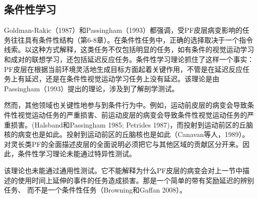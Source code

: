 \subsection{条件性学习}
Goldman-Rakic（1987）和Passingham（1993）都强调，受PF皮层病变影响的任务往往具有条件性结构（第6-8章）。在条件性任务中，正确的选择取决于一个指令线索。以这种方式解释，这类任务不仅包括明显的任务，如有条件的视觉运动学习和成对的联想学习，还包括延迟反应任务。条件性学习理论抓住了这样一个事实：PF皮层在根据当前环境灵活地生成目标方面起着关键作用，不管是在延迟反应任务上有延迟，还是在条件性视觉运动学习任务上没有延迟。该理论是由 Passingham（1993）提出的理论，涉及到了解剖学测试。
\par 
然而，其他领域也关键性地参与到条件行为中。例如，运动前皮层的病变会导致条件性视觉运动任务的严重损害、前运动皮层的病变会导致条件性视觉运动任务的严重损害。(Halsband和Passingham 1985; Petrides 1987)，而投射到运动前区的丘脑核的病变也是如此。投射到运动前区的丘脑核也是如此（Canavan等人，1989）。对灵长类PF的全面描述皮层的全面说明必须把它与其他区域的贡献区分开来。因此，条件性学习理论未能通过特异性测试。
\par 
该理论也未能通过通用性测试。它不能解释为什么PF皮层的病变会对上一节中描述的使用时间上延伸的事件的任务造成损害。那是一个简单的带有奖励延迟的辨别任务、 而不是一个条件性任务（Browning和Gaffan 2008）。
